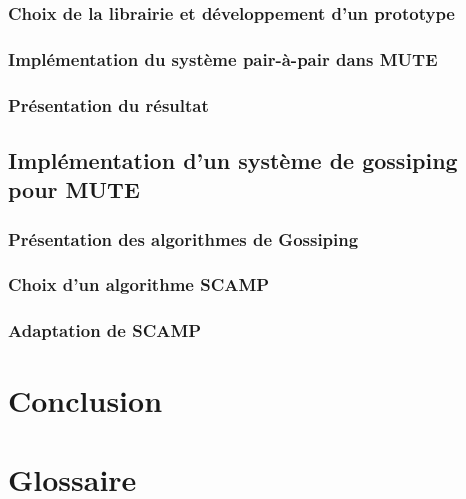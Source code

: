 \documentclass{tnreport}
\begin{document}
\subsection{Choix de la librairie et développement d'un prototype}

\subsection{Implémentation du système pair-à-pair dans MUTE}

\subsection{Présentation du résultat}

\section{Implémentation d'un système de gossiping pour MUTE}

\subsection{Présentation des algorithmes de Gossiping}

\subsection{Choix d'un algorithme SCAMP}

\subsection{Adaptation de SCAMP}

\chapter{Conclusion}

\cleardoublepage

\renewcommand{\tocbibname}{Bibliographie / Webographie}


\cleardoublepage

\listoffigures
\cleardoublepage

\listoftables
\cleardoublepage

\chapter*{Glossaire}
\end{document}

